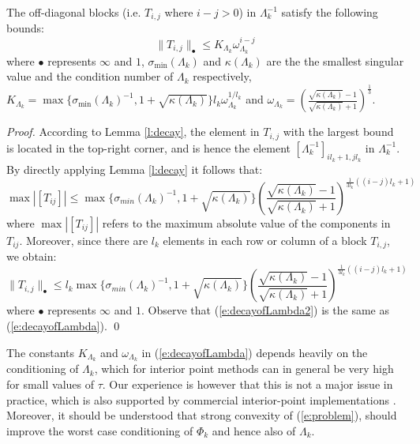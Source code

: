 \begin{proposition} \label{p:decayofLambda}
The off-diagonal blocks (i.e. $T_{i,j}$ where $i - j > 0$) in $\Lambda_k^{-1}$ satisfy the following bounds:
\begin{equation} \label{e:decayofLambda}
\| T_{i,j} \|_\bullet \leq K_{\Lambda_k} \omega_{\Lambda_k}^{i - j}
\end{equation}
where $\bullet$ represents $\infty$ and $1$, $\sigma_{\min}(\Lambda_k)$ and $\kappa(\Lambda_k)$ are the the smallest singular value and the condition number of $\Lambda_k$ respectively, $K_{\Lambda_k} = \max \{ \sigma_{\min}(\Lambda_k)^{-1}, 1 + \sqrt{\kappa(\Lambda_k)} \} l_k \omega_{\Lambda_k}^{1/l_k}$ and $\omega_{\Lambda_k} = \left( \frac{\sqrt{\kappa(\Lambda_k)} - 1}{\sqrt{\kappa(\Lambda_k)} + 1} \right)^{\frac{1}{3}}$.
\end{proposition}
\begin{proof}
According to Lemma \ref{l:decay}, the element in $T_{i,j}$ with the largest bound is located in the top-right corner, and is hence the element $[\Lambda_k^{-1}]_{i l_k + 1, j l_k}$ in $\Lambda_k^{-1}$. By directly applying Lemma \ref{l:decay} it follows that:
\begin{equation}
\max \left| [ T_{ij} ] \right| \leq \max \{ \sigma_{min}(\Lambda_k)^{-1}, 1 +  \sqrt{\kappa(\Lambda_k)} \} \left( \frac{ \sqrt{\kappa(\Lambda_k)} - 1}{ \sqrt{\kappa(\Lambda_k)} + 1} \right)^{\frac{1}{3l_k}((i - j)l_k + 1)}
\end{equation}
where $\max \left| [ T_{ij} ] \right| $ refers to the maximum absolute value of the components in $T_{ij}$. Moreover, since there are $l_k$ elements in each row or column of a block $T_{i,j}$, we obtain:
\begin{equation} \label{e:decayofLambda2}
\| T_{i,j} \|_\bullet \leq l_k \max \{ \sigma_{min}(\Lambda_k)^{-1}, 1 +  \sqrt{\kappa(\Lambda_k)} \} \left( \frac{ \sqrt{\kappa(\Lambda_k)} - 1}{ \sqrt{\kappa(\Lambda_k)} + 1} \right)^{\frac{1}{3l_k}((i - j)l_k + 1)}
\end{equation}
where $\bullet$ represents $\infty$ and $1$. Observe that (\ref{e:decayofLambda2}) is the same as (\ref{e:decayofLambda}).
\qed
\end{proof}
\begin{remark}
The constants $K_{\Lambda_k}$ and $\omega_{\Lambda_k}$ in (\ref{e:decayofLambda}) depends heavily on the conditioning of $\Lambda_k$, which for interior point methods can in general be very high for small values of $\tau$. Our experience is however that this is not a major issue in practice, which is also supported by commercial interior-point implementations \cite{WrightM1998} \cite{Domahidi2012}. Moreover, it should be understood that strong convexity of (\ref{e:problem}), should improve the worst case conditioning of $\Phi_k$ and hence also of $\Lambda_k$.
\end{remark}

